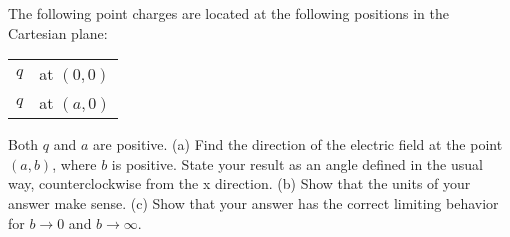 The following point charges are located at the following positions in the Cartesian plane:

\hspace{10mm}\begin{tabular}{rl}
$q$ & at $(0,0)$\\
$q$ & at $(a,0)$
\end{tabular}

Both $q$ and $a$ are positive. (a) Find the direction of the electric field at the point $(a,b)$, where $b$ is positive. State your result as
an angle defined in the usual way, counterclockwise from the x direction.
(b) Show that the units of your answer make sense.
(c) Show that your answer has the correct limiting behavior for $b\rightarrow 0$ and $b\rightarrow\infty$.

